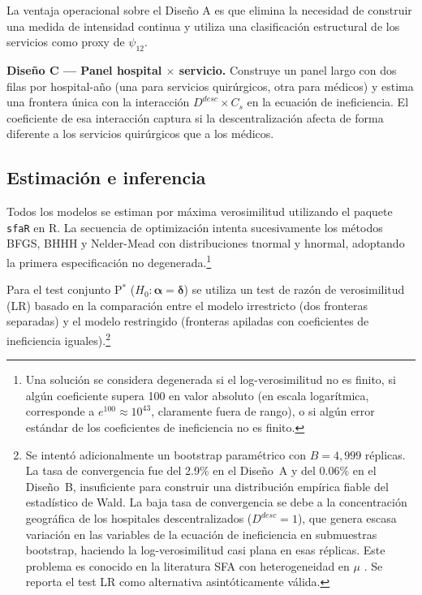 \documentclass[12pt, a4paper]{article}
\newcommand{\bsym}[1]{\boldsymbol{#1}}
\begin{document}
La ventaja operacional sobre el Diseño A es que elimina
la necesidad de construir una medida de intensidad
continua y utiliza una clasificación estructural de los
servicios como proxy de $\psi_{12}$.

\textbf{Diseño C --- Panel hospital $\times$ servicio.}
Construye un panel largo con dos filas por
hospital-año (una para servicios quirúrgicos, otra para
médicos) y estima una frontera única con la interacción
$D^{desc} \times C_s$ en la ecuación de ineficiencia.
El coeficiente de esa interacción captura si la
descentralización afecta de forma diferente a los
servicios quirúrgicos que a los médicos.

\subsection{Estimación e inferencia}

Todos los modelos se estiman por máxima verosimilitud
utilizando el paquete \texttt{sfaR} \citep{dakpo2024}
en R. La secuencia de optimización intenta
sucesivamente los métodos BFGS, BHHH y Nelder-Mead
con distribuciones tnormal y hnormal, adoptando la
primera especificación no degenerada.\footnote{
  Una solución se considera degenerada si el
  log-verosimilitud no es finito, si algún coeficiente
  supera 100 en valor absoluto (en escala logarítmica,
  corresponde a $e^{100} \approx 10^{43}$, claramente
  fuera de rango), o si algún error estándar de los
  coeficientes de ineficiencia no es finito.}

Para el test conjunto P$^*$ ($H_0: \bsym{\alpha} =
\bsym{\delta}$) se utiliza un test de razón de
verosimilitud (LR) basado en la comparación entre
el modelo irrestricto (dos fronteras separadas) y el
modelo restringido (fronteras apiladas con coeficientes
de ineficiencia iguales).\footnote{
  Se intentó adicionalmente un bootstrap paramétrico
  con $B = 4{,}999$ réplicas. La tasa de convergencia
  fue del 2.9\% en el Diseño~A y del 0.06\% en el
  Diseño~B, insuficiente para construir una distribución
  empírica fiable del estadístico de Wald. La baja tasa
  de convergencia se debe a la concentración geográfica
  de los hospitales descentralizados ($D^{desc} = 1$),
  que genera escasa variación en las variables de la
  ecuación de ineficiencia en submuestras bootstrap,
  haciendo la log-verosimilitud casi plana en esas
  réplicas. Este problema es conocido en la literatura
  SFA con heterogeneidad en $\mu$ \citep{simar2007}.
  Se reporta el test LR como alternativa asintóticamente
  válida.}
\end{document}
